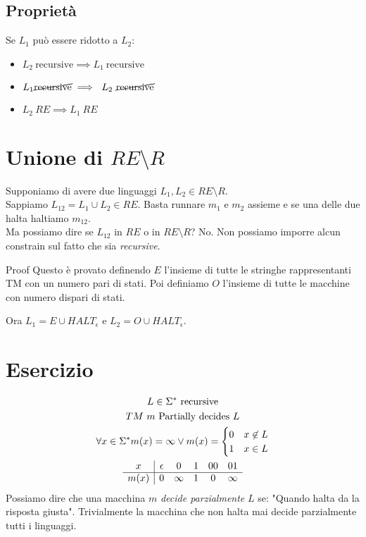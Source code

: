 \documentclass{article}
\begin{document}
\subsection{Proprietà}
Se $L_1$ può essere ridotto a $L_2$:
\begin{itemize}
    \item $L_2\ \text{recursive}\implies L_1\ \text{recursive}$
    \item $L_1\cancel{\text{recursive}} \implies\ L_2\ \cancel{\text{recursive}}$
    \item $L_2\ RE \implies L_1\ RE$
\end{itemize}

\section{Unione di $RE\setminus R$}
Supponiamo di avere due linguaggi $L_1,L_2\in RE\setminus R$. \\
Sappiamo $L_{12}=L_1\cup L_2 \in RE$. Basta runnare $m_1$ e $m_2$ assieme e se una delle due halta haltiamo $m_{12}$.\\
Ma possiamo dire se $L_12$ in $RE$ o in $RE\setminus R$? No. Non possiamo imporre alcun constrain sul fatto che sia \textit{recursive}.

\begin{callout}{Proof}
    Questo è provato definendo $E$ l'insieme di tutte le stringhe rappresentanti TM con un numero pari di stati. Poi definiamo $O$ l'insieme di tutte le macchine con numero dispari di stati.

    Ora $L_1=E\cup HALT_\epsilon$ e $L_2=O\cup HALT_\epsilon$.
\end{callout}

\section*{Esercizio}
\begin{gather*}
    L \in \Sigma^*\ \text{recursive} \\
    TM\ m\ \text{Partially decides }L \\
    \forall x\in\Sigma^* m(x)=\infty \vee m(x) = \begin{cases}0 & x\not\in L \\ 1 & x\in L\end{cases} \\
    \begin{array}{c | c c c c c}
        x & \epsilon & 0 & 1 & 00 & 01 \\
        \hline
        m(x) & 0 & \infty & 1 & 0 & \infty
    \end{array}
\end{gather*}
Possiamo dire che una macchina $m$ \textit{decide parzialmente} $L$ se: "Quando halta da la risposta giusta". Trivialmente la macchina che non halta mai decide parzialmente tutti i linguaggi.
\end{document}

